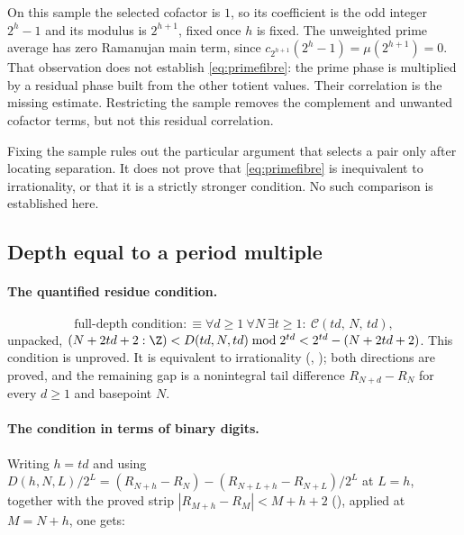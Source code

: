 On this sample the selected cofactor is $1$, so its coefficient is the
odd integer $2^h-1$ and its modulus is $2^{h+1}$, fixed once $h$ is fixed.
The unweighted prime average has zero Ramanujan main term, since
$c_{2^{h+1}}(2^h-1)=\mu(2^{h+1})=0$. That observation does not establish
\eqref{eq:primefibre}: the prime phase is multiplied by a residual phase
built from the other totient values. Their correlation is the missing
estimate. Restricting the sample removes the complement and unwanted
cofactor terms, but not this residual correlation.

\begin{rem}
Fixing the sample rules out the particular argument that selects a pair
only after locating separation. It does not prove that
\eqref{eq:primefibre} is inequivalent to irrationality, or that it is a
strictly stronger condition. No such comparison is established here.
\end{rem}

\subsection{Depth equal to a period multiple}

\paragraph{The quantified residue condition.}
\[
  \text{full-depth condition} :\equiv
  \forall d\ge 1\ \forall N\ \exists t\ge 1:\ \mathcal{C}(td,\,N,\,td),
\]
unpacked, $(N+2td+2:\Z)<D(td,N,td)\bmod 2^{td}<2^{td}-(N+2td+2)$.
This condition is unproved. It is equivalent to irrationality
(,
);
both directions are proved, and the remaining gap is a nonintegral tail
difference $R_{N+d}-R_N$ for every $d\ge1$ and basepoint $N$.

\paragraph{The condition in terms of binary digits.}
Writing $h=td$ and using
$D(h,N,L)/2^{L}=(R_{N+h}-R_N)-(R_{N+L+h}-R_{N+L})/2^{L}$ at $L=h$, together
with the proved strip $|R_{M+h}-R_M|<M+h+2$
(), applied at $M=N+h$, one gets:

